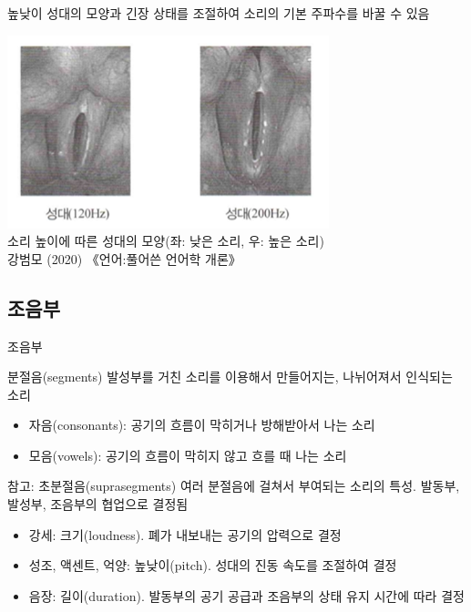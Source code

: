 \documentclass[11pt, aspectratio=169]{beamer}
\begin{document}
\begin{frame}[t]{}
    \begin{block}{높낮이}
        성대의 모양과 긴장 상태를 조절하여 소리의 기본 주파수를 바꿀 수 있음
    \end{block}
    \centering
    \includegraphics[width=0.7\textwidth]{img/vocal_folds_high_and_low_pitch.png}\\소리 높이에 따른 성대의 모양(좌: 낮은 소리, 우: 높은 소리) \\ 
    \small {강범모 (2020) 《언어:풀어쓴 언어학 개론》}   
\end{frame}

\subsection{조음부}

\begin{frame}[t]{조음부}
    \begin{block}{분절음(segments)}
        발성부를 거친 소리를 이용해서 만들어지는, 나뉘어져서 인식되는 소리
        \begin{itemize}
            \item 자음(consonants): 공기의 흐름이 막히거나 방해받아서 나는 소리
            \item 모음(vowels): 공기의 흐름이 막히지 않고 흐를 때 나는 소리
        \end{itemize}
    \end{block}
    \begin{block}{참고: 초분절음(suprasegments)}
        여러 분절음에 걸쳐서 부여되는 소리의 특성. 발동부, 발성부, 조음부의 협업으로 결정됨
        \begin{itemize}
            \item 강세: 크기(loudness). 폐가 내보내는 공기의 압력으로 결정
            \item 성조, 액센트, 억양: 높낮이(pitch). 성대의 진동 속도를 조절하여 결정
            \item 음장: 길이(duration). 발동부의 공기 공급과 조음부의 상태 유지 시간에 따라 결정
        \end{itemize}
    \end{block}
\end{frame}
\end{document}

